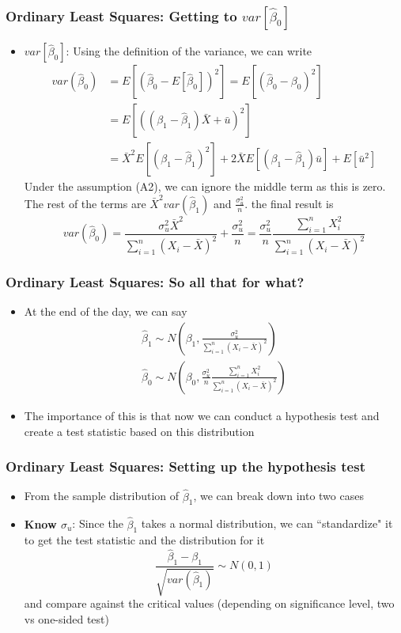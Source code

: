 \documentclass[aspectratio=169]{beamer}
\begin{document}
\begin{frame}
\frametitle{Ordinary Least Squares: Getting to $var[\hat{\beta}_0]$}
\begin{itemize}
\item $var[\hat{\beta}_0]$: Using the definition of the variance, we can write \[
\begin{aligned}
var(\hat{\beta}_0)&=E\left[\left(\hat{\beta}_0-E[\hat{\beta}_0]\right)^2\right] =E\left[\left(\hat{\beta}_0-{\beta}_0\right)^2\right]\\
&=E\left[\left( (\beta_1-\hat{\beta}_1)\bar{X}+\bar{u}\right)^2\right]\\
&=\bar{X}^2E\left[\left(\beta_1-\hat{\beta}_1 \right)^2\right]+ 2\bar{X}E\left[\left(\beta_1-\hat{\beta}_1 \right)\bar{u}\right] + E[\bar{u}^2]
\end{aligned}
\]
Under the assumption (A2), we can ignore the middle term as this is zero. The rest of the terms are $\bar{X}^2 var(\hat{\beta}_1)$ and $\frac{\sigma_u^2}{n}$. the final result is
\[
var(\hat{\beta}_0)=\frac{\sigma_u^2\bar{X}^2}{\sum_{i=1}^n(X_i-\bar{X})^2}+\frac{\sigma_u^2}{n}= \frac{\sigma_u^2}{n}\frac{\sum_{i=1}^nX_i^2}{\sum_{i=1}^n(X_i-\bar{X})^2}
\]
\end{itemize}
\end{frame}

\begin{frame}
\frametitle{Ordinary Least Squares: So all that for what?}

\begin{itemize}
\item At the end of the day, we can say
\begin{gather*}
 \hat{\beta}_1 \sim N\left(\beta_1, \frac{\sigma_u^2}{\sum_{i=1}^n(X_i-\bar{X})^2}\right) \\
\hat{\beta}_0 \sim N\left(\beta_0, \frac{\sigma_u^2}{n}\frac{\sum_{i=1}^nX_i^2}{\sum_{i=1}^n(X_i-\bar{X})^2}\right)
\end{gather*}
\item The importance of this is that now we can conduct a hypothesis test and create a test statistic based on this distribution
\end{itemize}
\end{frame}


\begin{frame}
\frametitle{Ordinary Least Squares: Setting up  the hypothesis test}

\begin{itemize}
\item From the sample distribution of $\hat{\beta}_1$, we can break down into two cases
\item \textbf{Know $\sigma_u$}: Since the $\hat{\beta}_1$ takes a normal distribution, we can ``standardize" it to get the test statistic and the distribution for it
\[
\frac{\hat{\beta}_1-\beta_1}{\sqrt{var(\hat{\beta}_1)}}\sim N(0,1)
\]
and compare against the critical values (depending on significance level, two vs one-sided test)
\end{itemize}
\end{frame}
\end{document}
